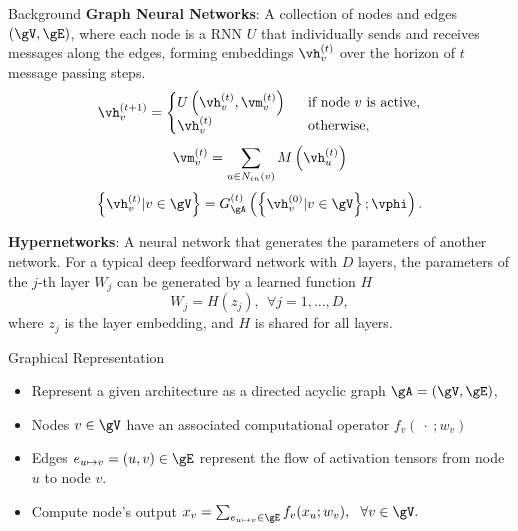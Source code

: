 \documentclass[final,t]{beamer}
\begin{document}
\begin{frame}{}
\begin{columns}[t]
\begin{column}{.32\linewidth}
    \begin{exampleblock}{Background}
	    \textbf{Graph Neural Networks}: 
	    A collection of nodes and edges $(\gV, \gE)$,
	    where each node is a RNN $U$ that individually sends and
		receives messages along the edges, 
		forming embeddings $\vh_v^{(t)}$ 
		over the horizon of $t$ message passing steps. 
				\begin{equation*}
			\vh_v^{(t+1)} = 
			\begin{cases}
			U \left(\vh_v^{(t)}, \vm_v^{(t)} \right) \ \ & \text{if node $v$ is active},\\
			\vh_v^{(t)} \ \ & \text{otherwise},
			\end{cases}
		\end{equation*}
		\begin{equation*}
			\vm_v^{(t)}=\sum_{u\in N_{in}(v)} M \left(\vh_u^{(t)} \right)
		\end{equation*}
	\begin{equation*}
	\left\{\vh_v^{(t)} | v \in \gV\right\} = 
	G_\gA^{(t)} \left(\left\{\vh_v^{(0)} | v \in \gV \right\}; \vphi \right).
	\end{equation*}

		\textbf{Hypernetworks}:
	  	A neural network that generates the parameters of
		another network. For a typical deep feedforward network with $D$ layers, 
		the parameters of the
		$j$-th layer $W_j$ can be generated by a learned function $H$
		\begin{equation*}
			W_j = H(z_j), \ \ \forall j = 1, \dots, D,
		\end{equation*}
		where $z_j$ is the layer embedding, and $H$ is shared for all layers.  	
    \end{exampleblock}    

	\begin{exampleblock}{Graphical Representation}
    \begin{itemize}
        \item Represent a given architecture as a directed acyclic graph 
    			$\gA = (\gV, \gE)$, 
    \item Nodes $v \in \gV$  have an associated computational operator
    			 $f_v(\ \cdot \ ;w_v)$
	\item Edges $e_{u \mapsto v} = (u, v) \in \gE$ represent the flow of
			activation tensors from node $u$ to node $v$. 
	\item Compute node's output 
			$x_v = \sum_{e_{u \mapsto v} \in \gE} f_v(x_u; w_v), \ \ \forall v \in \gV.$  	
    \end{itemize}


\end{exampleblock}
\end{column}
\end{columns}
\end{frame}
\end{document}
